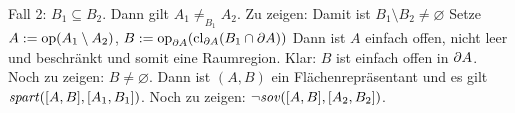     Fall 2: $B_1 \subseteq B_2$.
        Dann gilt $A_1 \neq_{B_1} A_2$.
        Zu zeigen: Damit ist $B_1 \setminus B_2 \neq \varnothing$
        Setze $A := \text{op}(A_1 \setminus A_2)$, $B := \text{op}_{\partial A}(\text{cl}_{\partial A}(B_1 \cap \partial A))$
        Dann ist $A$ einfach offen, nicht leer und beschränkt und somit eine Raumregion.
        Klar: $B$ ist einfach offen in $\partial A$. Noch zu zeigen: $B \neq \varnothing$.
        Dann ist $(A,B)$ ein Flächenrepräsentant und es gilt $\mathit{spart}([A,B],[A_1,B_1])$.
        Noch zu zeigen: $\neg \mathit{sov}([A,B],[A_2,B_2])$.
            



